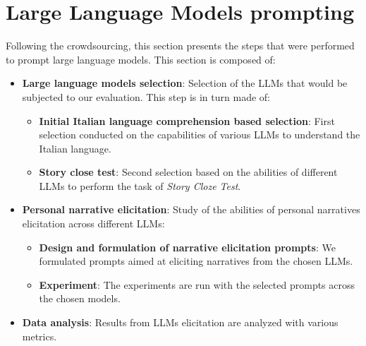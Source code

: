 \section{Large Language Models prompting}
Following the crowdsourcing, this section presents the steps that were performed to prompt large language models. This section is composed of:
\begin{itemize}
    \item \textbf{Large language models selection}: Selection of the LLMs that would be subjected to our evaluation. This step is in turn made of:
    \begin{itemize}
        \item \textbf{Initial Italian language comprehension based selection}: First selection conducted on the capabilities of various LLMs to understand the Italian language.
        \item \textbf{Story close test}: Second selection based on the abilities of different LLMs to perform the task of \emph{Story Cloze Test}.
    \end{itemize}
    \item \textbf{Personal narrative elicitation}: Study of the abilities of personal narratives elicitation across different LLMs:
    \begin{itemize}
        \item \textbf{Design and formulation of narrative elicitation prompts}: We formulated prompts aimed at eliciting narratives from the chosen LLMs.
        \item \textbf{Experiment}: The experiments are run with the selected prompts across the chosen models.
    \end{itemize}
    \item \textbf{Data analysis}: Results from LLMs elicitation are analyzed with various metrics.
\end{itemize}